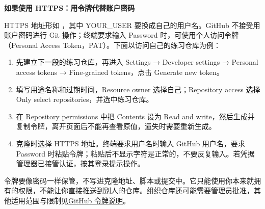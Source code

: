 \par\medskip\noindent\textbf{如果使用 HTTPS：用令牌代替账户密码}\par
HTTPS 地址形如 ，其中 YOUR\_USER 要换成自己的用户名。GitHub 不接受用账户密码进行 Git 操作；终端要求输入 Password 时，可使用个人访问令牌（Personal Access Token，PAT）。下面以访问自己的练习仓库为例：
\begin{enumerate}
\item 先建立下一段的练习仓库，再进入 Settings → Developer settings → Personal access tokens → Fine-grained tokens，点击 Generate new token。
\item 填写用途名称和过期时间，Resource owner 选择自己；Repository access 选择 Only select repositories，并选中练习仓库。
\item 在 Repository permissions 中把 Contents 设为 Read and write，然后生成并复制令牌，离开页面后不能再查看原值，遗失时需要重新生成。
\item 克隆时选择 HTTPS 地址。终端要求用户名时输入 GitHub 用户名，要求 Password 时粘贴令牌；粘贴后不显示字符是正常的，不要反复输入。若凭据管理器已接管认证，按其登录提示操作。
\end{enumerate}
令牌要像密码一样保管，不写进克隆地址、脚本或提交中。它只能使用你本来就拥有的权限，不能让你直接推送到别人的仓库。组织仓库还可能需要管理员批准，其他适用范围与限制见\href{https://docs.github.com/en/authentication/keeping-your-account-and-data-secure/managing-your-personal-access-tokens}{GitHub 令牌说明}。

